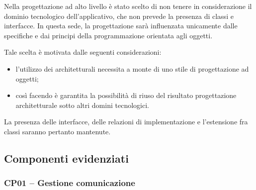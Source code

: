 Nella progettazione ad alto livello è stato scelto di non tenere in considerazione il dominio tecnologico dell'applicativo, che non prevede la presenza di classi e interfacce. In questa sede, la progettazione sarà influenzata unicamente dalle specifiche e dai principi della programmazione orientata agli oggetti.

Tale scelta è motivata dalle seguenti considerazioni:
\begin{itemize}
   \item l'utilizzo dei  architetturali necessita a monte di uno stile di progettazione ad oggetti;
   \item così facendo è garantita la possibilità di riuso del risultato progettazione architetturale sotto altri domini tecnologici.
\end{itemize}

La presenza delle interfacce, delle relazioni di implementazione e l'estensione fra classi saranno pertanto mantenute.

\subsection{Componenti evidenziati}

\subsubsection{CP01 -- Gestione comunicazione}

